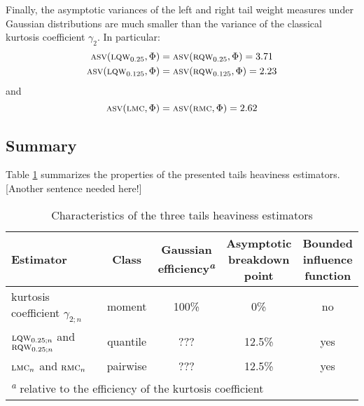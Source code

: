 Finally, the asymptotic variances of the left and right tail weight measures    
under Gaussian distributions are much smaller than the variance of the classical
kurtosis coefficient $\gamma_2$. In particular:                                 
%
\begin{align*}
    \stsc{ASV}(\stsc{LQW}_{0.25}, \Phi)   & = \stsc{ASV}(\stsc{RQW}_{0.25}, \Phi)  = 3.71 \\
    \stsc{ASV}(\stsc{LQW}_{0.125}, \Phi)  & = \stsc{ASV}(\stsc{RQW}_{0.125}, \Phi) = 2.23
\end{align*}
%
and
\[
    \stsc{ASV}(\stsc{LMC}, \Phi)  = \stsc{ASV}(\stsc{RMC}, \Phi) = 2.62
\]


\subsection{Summary}

Table \ref{tab:stat:kurt} summarizes the properties of the presented tails
heaviness estimators. \alert{[Another sentence needed here!]}           

\begin{table}[h!]
    \centering
    \caption{Characteristics of the three tails heaviness estimators}
    \label{tab:stat:kurt}
    \begin{tabular}{lcccc}
        \toprule
        Estimator
        & Class  
        & \subtab{c}{Gaussian\\ efficiency\textsuperscript{\textit{a}}}
        & \subtab{c}{Asymptotic\\ breakdown\\ point} 
        & \subtab{c}{Bounded\\ influence\\ function}
        \\\midrule
        kurtosis coefficient $\gamma_{2;n}$                  & moment   & 100\%        &  0\% & no
        \\\addlinespace
        $\stsc{LQW}_{0.25;n}$ and $\stsc{RQW}_{0.25;n}$      & quantile & \alert{???} & 12.5\% & yes
        \\\addlinespace
        $\stsc{LMC}_n$ and $\stsc{RMC}_n$                    & pairwise & \alert{???} & 12.5\% & yes
        \\\bottomrule
        \multicolumn{5}{l}{\footnotesize\textsuperscript{\textit{a}} relative to the 
        efficiency of the kurtosis coefficient}
    \end{tabular}
\end{table}

